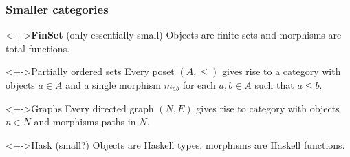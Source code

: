 \documentclass{beamer}
\begin{document}
\begin{frame}
  \frametitle{Smaller categories}
  \begin{block}<+->{\textbf{FinSet} (only essentially small)}
    Objects are finite sets and morphisms are total functions.
  \end{block}
  \begin{block}<+->{Partially ordered sets}
    Every poset $(A, \le)$ gives rise to a category with objects $a\in
    A$ and a single morphism $m_{ab}$ for each $a, b\in A$ such that
    $a \le b$. 
  \end{block}
  \begin{block}<+->{Graphs}
    Every directed graph $(N, E)$ gives rise to category with objects $n\in N$
    and morphisms paths in $N$.
  \end{block}
  \begin{block}<+->{Hask (small?)}
    Objects are Haskell types, morphisms are Haskell functions.
  \end{block}
\end{frame}
\end{document}
